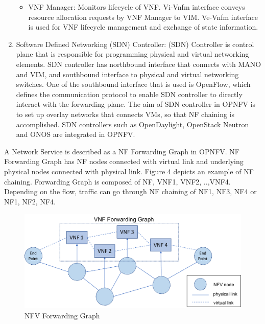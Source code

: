 \begin{enumerate}
\begin{itemize}
			\item VNF Manager: Monitors lifecycle of VNF. Vi-Vnfm interface conveys resource allocation requests by VNF Manager to VIM. Ve-Vnfm interface is used for VNF lifecycle management and exchange of state information. 
		\end{itemize}
	\item Software Defined Networking (SDN) Controller: (SDN) Controller is control plane that is responsible for programming physical and virtual networking elements. SDN controller has northbound interface that connects with MANO and VIM, and southbound interface to physical and virtual networking switches. One of the southbound interface that is used is OpenFlow, which defines the communication protocol to enable SDN controller to directly interact with the forwarding plane. 
The aim of SDN controller in OPNFV is to set up overlay networks that connects VMs, so that NF chaining is accomplished. SDN controllers such as OpenDaylight, OpenStack Neutron and ONOS are integrated in OPNFV.
\end{enumerate}

A Network Service is described as a NF Forwarding Graph in OPNFV. NF Forwarding Graph has NF nodes connected with virtual link and underlying physical nodes connected with physical link. Figure 4 depicts an example of NF chaining. Forwarding Graph is composed of NF, VNF1, VNF2, ..,VNF4. Depending on the flow, traffic can go through NF chaining of NF1, NF3, NF4 or NF1, NF2, NF4. 
\begin{figure}
	\centering
	\includegraphics[width=120mm]{pics/NFV_FG.pdf}
	\caption{NFV Forwarding Graph}
	\label{fig: OPNFV_FG}
\end{figure}

